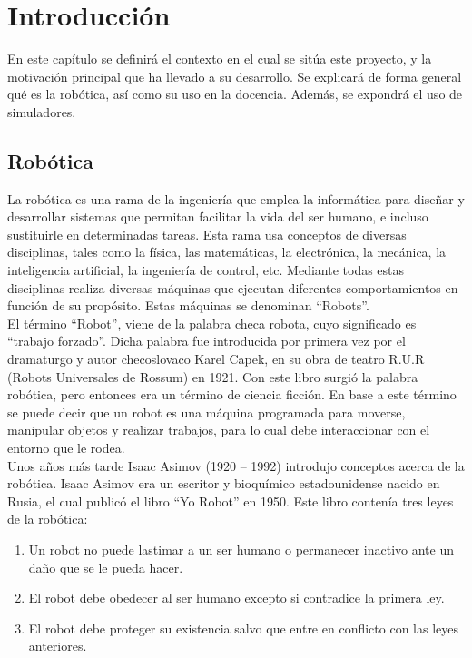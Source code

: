 \chapter{Introducción}\label{cap.introduccion}
En este capítulo se definirá el contexto en el cual se sitúa este proyecto, y la motivación principal que ha llevado a su desarrollo. Se explicará de forma general qué es la robótica, así como su uso en la docencia. Además, se expondrá el uso de simuladores.\\

\section{Robótica}

La robótica es una rama de la ingeniería que emplea la informática para diseñar y desarrollar sistemas que permitan facilitar la vida del ser humano, e incluso sustituirle en determinadas tareas. Esta rama usa conceptos de diversas disciplinas, tales como la física, las matemáticas, la electrónica, la mecánica, la inteligencia artificial, la ingeniería de control, etc. Mediante todas estas disciplinas realiza diversas máquinas que ejecutan diferentes comportamientos en función de su propósito. Estas máquinas se denominan ``Robots''.\\

El término ``Robot'', viene de la palabra checa robota, cuyo significado es ``trabajo forzado''. Dicha palabra fue introducida por primera vez por el dramaturgo y autor checoslovaco Karel Capek, en su obra de teatro R.U.R (Robots Universales de Rossum) en 1921. Con este libro surgió la palabra robótica, pero entonces era un término de ciencia ficción. En base a este término se puede decir que un robot es una máquina programada para moverse, manipular objetos y realizar trabajos, para lo cual debe interaccionar con el entorno que le rodea.\\

Unos años más tarde Isaac Asimov (1920 -- 1992) introdujo conceptos acerca de la robótica. Isaac Asimov era un escritor y bioquímico estadounidense nacido en Rusia, el cual publicó el libro ``Yo Robot'' en 1950. Este libro contenía tres leyes de la robótica:

\begin{enumerate}[1.]
    \item Un robot no puede lastimar a un ser humano o permanecer inactivo ante un daño que se le pueda hacer.
    \item El robot debe obedecer al ser humano excepto si contradice la primera ley.
    \item El robot debe proteger su existencia salvo que entre en conflicto con las leyes anteriores.
\end{enumerate}


